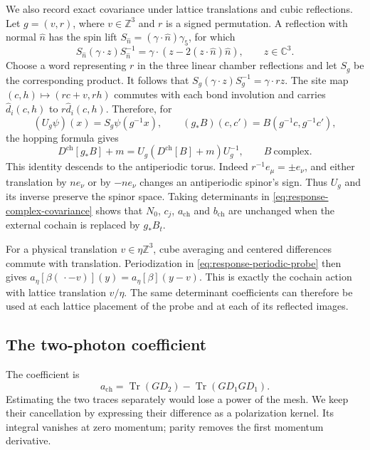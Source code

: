 \documentclass[11pt,letterpaper,reqno]{amsart}
\newcommand{\C}{\mathbb C}
\newcommand{\Z}{\mathbb Z}
\begin{document}
We also record exact covariance under lattice translations and cubic
reflections. Let $g=(v,r)$, where $v\in\Z^3$ and $r$ is a signed
permutation. A reflection with normal $\widehat n$ has the spin lift
$S_{\widehat n}=(\gamma\cdot\widehat n)\gamma_5$, for which
\[
 S_{\widehat n}(\gamma\cdot z)S_{\widehat n}^{-1}
       =\gamma\cdot(z-2(z\cdot\widehat n)\widehat n),
                         \qquad z\in\C^3.
\]
Choose a word representing $r$ in the three linear chamber
reflections and let $S_g$ be the corresponding product. It follows
that $S_g(\gamma\cdot z)S_g^{-1}=\gamma\cdot rz$.
The site map $(c,h)\mapsto(rc+v,rh)$ commutes with each bond
involution and carries $\widehat d_i(c,h)$ to
$r\widehat d_i(c,h)$. Therefore, for
\[
 (U_g\psi)(x)=S_g\psi(g^{-1}x),\qquad
 (g_*B)(c,c')=B(g^{-1}c,g^{-1}c'),
\]
the hopping formula gives
\begin{equation}\label{eq:response-complex-covariance}
 D^{\mathrm{ch}}[g_*B]+m
       =U_g(D^{\mathrm{ch}}[B]+m)U_g^{-1},
                                             \qquad B\ \text{complex}.
\end{equation}
This identity descends to the antiperiodic torus. Indeed
$r^{-1}e_\mu=\pm e_\nu$, and either translation by $ne_\nu$
or by $-ne_\nu$ changes an antiperiodic spinor's sign.
Thus $U_g$ and its inverse preserve the spinor space.
Taking determinants in \eqref{eq:response-complex-covariance}
shows that $N_0$, $c_j$, $a_{\mathrm{ch}}$ and $b_{\mathrm{ch}}$
are unchanged when the external cochain is replaced by $g_*B_t$.

For a physical translation $v\in\eta\Z^3$, cube averaging and
centered differences commute with translation. Periodization in
\eqref{eq:response-periodic-probe} then gives
$a_\eta[\beta(\,\cdot-v)](y)=a_\eta[\beta](y-v)$.
This is exactly the cochain action with lattice translation $v/\eta$.
The same determinant coefficients can therefore be used at each
lattice placement of the probe and at each of its reflected images.

\subsection{The two-photon coefficient}\label{subsec:response-polarization}

The coefficient is
\[
 a_{\mathrm{ch}}=\operatorname{Tr}(GD_2)-
                     \operatorname{Tr}(GD_1GD_1).
\]
Estimating the two traces separately would lose a power of the mesh.
We keep their cancellation by expressing their difference
as a polarization kernel. Its integral vanishes at zero momentum;
parity removes the first momentum derivative.
\end{document}
